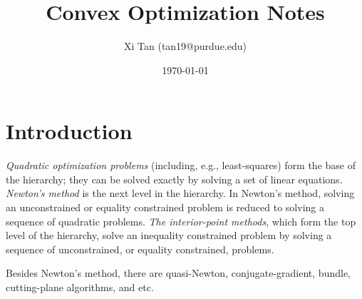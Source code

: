 \documentclass{article}
\title{Convex Optimization Notes}
\author{Xi Tan (tan19@purdue.edu)}
\date{\today}
\begin{document}
\maketitle

\section{Introduction}
{\em{Quadratic optimization problems}} (including, e.g., least-squares) form the base of the hierarchy; they can be solved exactly by solving a set of linear equations. {\em{Newton's method}} is the next level in the hierarchy. In Newton's method, solving an unconstrained or equality constrained problem is reduced to solving a sequence of quadratic problems. {\em{The interior-point methods}}, which form the top level of the hierarchy, solve an inequality constrained problem by solving a sequence of unconstrained, or equality constrained, problems.

Besides Newton's method, there are quasi-Newton, conjugate-gradient, bundle, cutting-plane algorithms, and etc.
\end{document}
